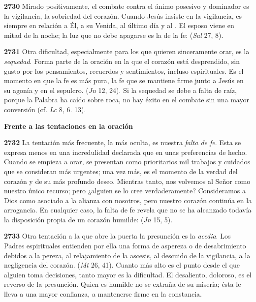 \textbf{2730} Mirado positivamente, el combate contra el ánimo posesivo y dominador es la vigilancia, la sobriedad del corazón. Cuando Jesús insiste en la vigilancia, es siempre en relación a Él, a su Venida, al último día y al . El esposo viene en mitad de la noche; la luz que no debe apagarse es la de la fe:  (\emph{Sal} 27, 8).

\textbf{2731} Otra dificultad, especialmente para los que quieren sinceramente orar, es la \emph{sequedad}. Forma parte de la oración en la que el corazón está desprendido, sin gusto por los pensamientos, recuerdos y sentimientos, incluso espirituales. Es el momento en que la fe es más pura, la fe que se mantiene firme junto a Jesús en su agonía y en el sepulcro.  (\emph{Jn} 12, 24). Si la sequedad se debe a falta de raíz, porque la Palabra ha caído sobre roca, no hay éxito en el combate sin una mayor conversión (cf. \emph{Lc} 8, 6. 13).



\textbf{Frente a las tentaciones en la oración}

\textbf{2732} La tentación más frecuente, la más oculta, es nuestra \emph{falta de fe}. Esta se expresa menos en una incredulidad declarada que en unas preferencias de hecho. Cuando se empieza a orar, se presentan como prioritarios mil trabajos y cuidados que se consideran más urgentes; una vez más, es el momento de la verdad del corazón y de su más profundo deseo. Mientras tanto, nos volvemos al Señor como nuestro único recurso; pero ¿alguien se lo cree verdaderamente? Consideramos a Dios como asociado a la alianza con nosotros, pero nuestro corazón continúa en la arrogancia. En cualquier caso, la falta de fe revela que no se ha alcanzado todavía la disposición propia de un corazón humilde:  (\emph{Jn} 15, 5).

\textbf{2733} Otra tentación a la que abre la puerta la presunción es la \emph{acedia}. Los Padres espirituales entienden por ella una forma de aspereza o de desabrimiento debidos a la pereza, al relajamiento de la ascesis, al descuido de la vigilancia, a la negligencia del corazón.  (\emph{Mt} 26, 41). Cuanto más alto es el punto desde el que alguien toma decisiones, tanto mayor es la dificultad. El desaliento, doloroso, es el reverso de la presunción. Quien es humilde no se extraña de su miseria; ésta le lleva a una mayor confianza, a mantenerse firme en la constancia.

